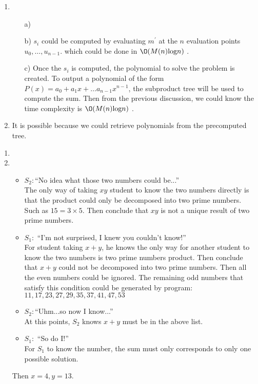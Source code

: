\documentclass{assignment}
\begin{document}
\begin{homeworkProblem}
\begin{enumerate}
\item 
\begin{enumerate}
\item[a)]
\item[b)] $s_i$ could be computed by evaluating $m^{'}$ at the $n$ evaluation points $u_0,\dots, u_{n-1}$. which could be done in $\O(M(n)\text{log}n)$ .
\item[c)] Once the $s_i$ is computed, the polynomial to solve the problem is created. To output a polynomial of the form $P(x)=a_0+a_1x+\dots a_{n-1}x^{n-1}$, the subproduct tree will be used to compute the sum. Then from the previous discussion, we could know the time complexity is $\O(M(n)\text{log}n)$ .
\end{enumerate}
\item It is possible because we could retrieve polynomials from the precomputed tree. 
\end{enumerate}
    
    
    \end{homeworkProblem}

\newpage
    
    \begin{homeworkProblem}

\begin{enumerate}
\item
\item 
\begin{itemize}
\item \textbf{$S_2:$}``No idea what those two numbers could be...” \\
The only way of taking $xy$ student to know the two numbers directly is that the product could only be decomposed into two prime numbers. Such as $15=3\times 5$. Then conclude that $xy$ is not a unique result of two prime numbers. 
\item \textbf{$S_1:$}  ``I’m not surprised, I knew you couldn’t know!” \\
For student taking $x+y$, he knows the only way for another student to know the two numbers  is two prime numbers product. Then conclude that $x+y$ could not be decomposed into two prime numbers. Then all the even numbers could be ignored. The remaining odd numbers that satisfy this condition could be generated by program: $11, 17, 23, 27, 29, 35, 37, 41, 47, 53$
\item \textbf{$S_2:$}``Uhm...so now I know...” \\
At this points, $S_2$ knows $x+y$ must be in the above list. 
\item \textbf{$S_1:$}  ``So do I!” \\
For $S_1$ to know the number, the sum must only corresponds to only one possible solution. 
\end{itemize}
Then $x=4, y=13$.
\end{enumerate}
    
    \end{homeworkProblem}
    
\end{document}
